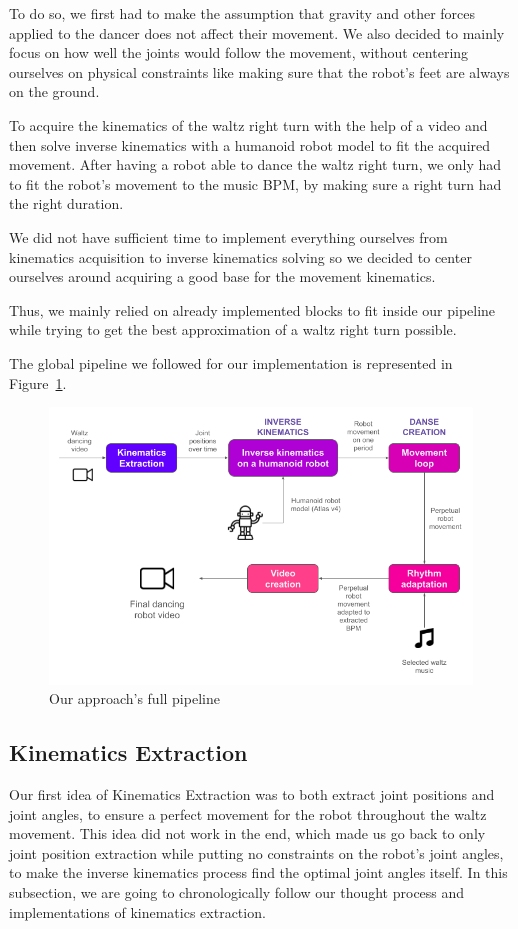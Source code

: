 \documentclass{amsart}
\theoremstyle{definition}
\theoremstyle{plain}
\begin{document}
To do so, we first had to make the assumption that gravity and other forces applied to the dancer does not affect their movement. We also decided to mainly focus on how well the joints would follow the movement, without centering ourselves on physical constraints like making sure that the robot's feet are always on the ground.

To acquire the kinematics of the waltz right turn with the help of a video and then solve inverse kinematics with a humanoid robot model to fit the acquired movement. 
After having a robot able to dance the waltz right turn, we only had to fit the robot's movement to the music BPM, by making sure a right turn had the right duration.

We did not have sufficient time to implement everything ourselves from kinematics acquisition to inverse kinematics solving so we decided to center ourselves around acquiring a good base for the movement kinematics. 

Thus, we mainly relied on already implemented blocks to fit inside our pipeline while trying to get the best approximation of a waltz right turn possible.

The global pipeline we followed for our implementation is represented in Figure~\ref{fig:pipeline}.

\begin{figure}
  \includegraphics[width = 0.75 \columnwidth]{img/final_solution_pipeline.png}
  \caption{Our approach's full pipeline}\label{fig:pipeline}
\end{figure}

\subsection{Kinematics Extraction}
Our first idea of Kinematics Extraction was to both extract joint positions and joint angles, to ensure a perfect movement for the robot throughout the waltz movement. This idea did not work in the end, which made us go back to only joint position extraction while putting no constraints on the robot's joint angles, to make the inverse kinematics process find the optimal joint angles itself. In this subsection, we are going to chronologically follow our thought process and implementations of kinematics extraction.
\end{document}
